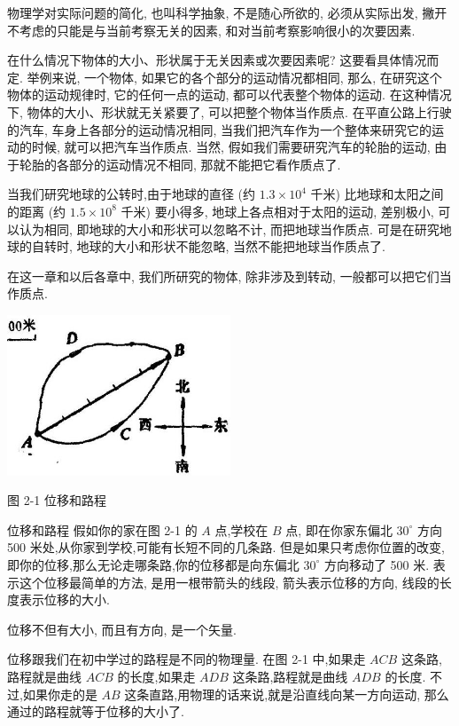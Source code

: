 \documentclass[10pt]{article}
\begin{document}
物理学对实际问题的简化, 也叫科学抽象, 不是随心所欲的, 必须从实际出发, 撇开不考虑的只能是与当前考察无关的因素, 和对当前考察影响很小的次要因素.

在什么情况下物体的大小、形状属于无关因素或次要因素呢? 这要看具体情况而定. 举例来说, 一个物体, 如果它的各个部分的运动情况都相同, 那么, 在研究这个物体的运动规律时, 它的任何一点的运动, 都可以代表整个物体的运动. 在这种情况下, 物体的大小、形状就无关紧要了, 可以把整个物体当作质点. 在平直公路上行驶的汽车, 车身上各部分的运动情况相同, 当我们把汽车作为一个整体来研究它的运动的时候, 就可以把汽车当作质点. 当然, 假如我们需要研究汽车的轮胎的运动, 由于轮胎的各部分的运动情况不相同, 那就不能把它看作质点了.

当我们研究地球的公转时,由于地球的直径 (约 \({1.3} \times {10}^{4}\) 千米) 比地球和太阳之间的距离 (约 \({1.5} \times {10}^{8}\) 千米) 要小得多, 地球上各点相对于太阳的运动, 差别极小, 可以认为相同, 即地球的大小和形状可以忽略不计, 而把地球当作质点. 可是在研究地球的自转时, 地球的大小和形状不能忽略, 当然不能把地球当作质点了.

在这一章和以后各章中, 我们所研究的物体, 除非涉及到转动, 一般都可以把它们当作质点.

\begin{center}
\includegraphics[max width=0.5\textwidth]{images/01912d55-147c-70aa-b0e0-1782a122f948_56_530856.jpg}
\end{center}

图 2-1 位移和路程

位移和路程 假如你的家在图 2-1 的 \(A\) 点,学校在 \(B\) 点, 即在你家东偏北 \({30}^{ \circ }\) 方向 500 米处,从你家到学校,可能有长短不同的几条路. 但是如果只考虑你位置的改变, 即你的位移,那么无论走哪条路,你的位移都是向东偏北 \({30}^{ \circ }\) 方向移动了 500 米. 表示这个位移最简单的方法, 是用一根带箭头的线段, 箭头表示位移的方向, 线段的长度表示位移的大小.

位移不但有大小, 而且有方向, 是一个矢量.

位移跟我们在初中学过的路程是不同的物理量. 在图 2-1 中,如果走 \({ACB}\) 这条路,路程就是曲线 \({ACB}\) 的长度,如果走 \({ADB}\) 这条路,路程就是曲线 \({ADB}\) 的长度. 不过,如果你走的是 \({AB}\) 这条直路,用物理的话来说,就是沿直线向某一方向运动, 那么通过的路程就等于位移的大小了.
\end{document}

